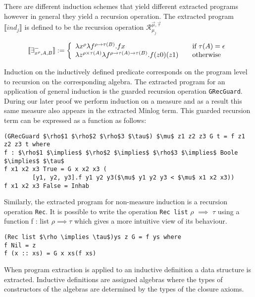 There are different induction schemes  that yield different extracted programs however in general they yield a recursion operation. The extracted program $\llbracket ind_j \rrbracket$ is defined to be the recursion operation $\mathcal{R}^{\vec{\mu},\vec{\tau}}_{\mu_j}$


\[ \llbracket \exists^{-}_{x^{\rho}, A, B} \rrbracket := \left\{ 
\begin{array}{l l}
\lambda x^{\rho} \lambda f^{\rho \to \tau (B)}. f x  & \quad \text{if $\tau (A) = \epsilon$} \\ 
\lambda z^{\rho \times \tau (A)} \lambda f^{\rho \to \tau (A) \to \tau (B)}. f
(z0) (z1) & \quad \text{otherwise} \\
\end{array} \right.
\]


Induction on the inductively defined predicate corresponds on the program level  to recursion on the corresponding algebra. 
The extracted program for an application of general induction is the guarded recursion operation \texttt{GRecGuard}. During our later proof we perform induction on a measure and as a result this same measure also appears in the extracted Minlog term.  This guarded recursion term can be expressed as a function as follows:

\begin{lstlisting}[caption = The Guarded Recursion Operation Used in the Minlog System, mathescape]
(GRecGuard $\rho$1 $\rho$2 $\rho$3 $\tau$) $\mu$ z1 z2 z3 G t = f z1 z2 z3 t where
f : $\rho$1 $\implies$ $\rho$2 $\implies$ $\rho$3 $\implies$ Boole $\implies$ $\tau$
f x1 x2 x3 True = G x x2 x3 (
        [y1, y2, y3].f y1 y2 y3($\mu$ y1 y2 y3 < $\mu$ x1 x2 x3))
f x1 x2 x3 False = Inhab
\end{lstlisting}


Similarly, the extracted program for non-measure induction is a recursion operation \texttt{Rec}. It is possible to write the operation \texttt{Rec list} $\rho$ $\implies$ $\tau$ using a function
f : list $\rho \implies \tau$ which gives a more intuitive view of its behaviour.
\begin{lstlisting}[caption = The Recursion Operation Used in the Minlog System ,mathescape]
(Rec list $\rho \implies \tau$)ys z G = f ys where
f Nil = z
f (x :: xs) = G x xs(f xs)
\end{lstlisting}


When program extraction is applied to an inductive definition a data structure is extracted. Inductive definitions are assigned algebras 
where the types of constructors of the algebras are determined by the types of the closure axioms.
